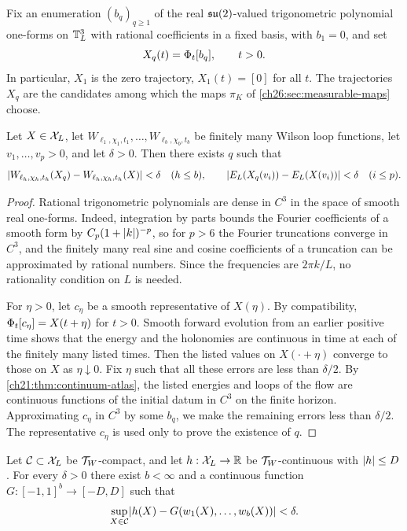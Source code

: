 Fix an enumeration $(b_q)_{q\ge1}$ of the real $\mathfrak{su}(2)$-valued trigonometric polynomial one-forms on $\mathbb T_L^3$ with rational coefficients in a fixed basis, with $b_1=0$, and set
\[
 X_q(t)=\Phi_t[b_q],\qquad t>0 .
\]
In particular, $X_1$ is the zero trajectory, $X_1(t)=[0]$ for all $t$. The trajectories $X_q$ are the candidates among which the maps $\pi_K$ of \cref{ch26:sec:measurable-maps} choose.

\begin{lemma}\label{ch26:lem:energy-loop-dictionary}
Let $X\in\mathcal X_L$, let $W_{\ell_1,\chi_1,t_1},\dots,W_{\ell_b,\chi_b,t_b}$ be finitely many Wilson loop functions, let $v_1,\dots,v_p>0$, and let $\delta>0$. Then there exists $q$ such that
\[
 \lvert W_{\ell_h,\chi_h,t_h}(X_q)-W_{\ell_h,\chi_h,t_h}(X)\rvert<\delta\quad(h\le b),\qquad \lvert E_L(X_q(v_i))-E_L(X(v_i))\rvert<\delta\quad(i\le p).
\]
\end{lemma}

\begin{proof}
Rational trigonometric polynomials are dense in $C^3$ in the space of smooth real one-forms. Indeed, integration by parts bounds the Fourier coefficients of a smooth form by $C_p(1+\lvert k\rvert)^{-p}$, so for $p>6$ the Fourier truncations converge in $C^3$, and the finitely many real sine and cosine coefficients of a truncation can be approximated by rational numbers. Since the frequencies are $2\pi k/L$, no rationality condition on $L$ is needed.

For $\eta>0$, let $c_\eta$ be a smooth representative of $X(\eta)$. By compatibility, $\Phi_t[c_\eta]=X(t+\eta)$ for $t>0$. Smooth forward evolution from an earlier positive time shows that the energy and the holonomies are continuous in time at each of the finitely many listed times. Then the listed values on $X(\cdot+\eta)$ converge to those on $X$ as $\eta\downarrow0$. Fix $\eta$ such that all these errors are less than $\delta/2$. By \cref{ch21:thm:continuum-atlas}, the listed energies and loops of the flow are continuous functions of the initial datum in $C^3$ on the finite horizon. Approximating $c_\eta$ in $C^3$ by some $b_q$, we make the remaining errors less than $\delta/2$. The representative $c_\eta$ is used only to prove the existence of $q$.
\end{proof}

\begin{lemma}\label{ch26:lem:compact-wilson-cylinder}
Let $\mathcal C\subset\mathcal X_L$ be $\mathcal T_W$-compact, and let $h:\mathcal X_L\to\mathbb R$ be $\mathcal T_W$-continuous with $\lvert h\rvert\le D$. For every $\delta>0$ there exist $b<\infty$ and a continuous function $G:[-1,1]^b\to[-D,D]$ such that
\[
 \sup_{X\in\mathcal C}\lvert h(X)-G(w_1(X),\dots,w_b(X))\rvert<\delta .
\]
\end{lemma}

